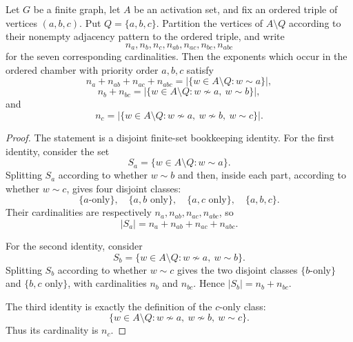 \begin{helper}
Let $G$ be a finite graph, let $A$ be an activation set, and fix an ordered
triple of vertices $(a,b,c)$.  Put $Q=\{a,b,c\}$.  Partition the vertices of
$A\setminus Q$ according to their nonempty adjacency pattern to the ordered
triple, and write
\[
n_a,n_b,n_c,n_{ab},n_{ac},n_{bc},n_{abc}
\]
for the seven corresponding cardinalities.  Then the exponents which occur in
the ordered chamber with priority order $a,b,c$ satisfy
\[
n_a+n_{ab}+n_{ac}+n_{abc}
=|\{w\in A\setminus Q:w\sim a\}|,
\]
\[
n_b+n_{bc}
=|\{w\in A\setminus Q:w\not\sim a,\ w\sim b\}|,
\]
and
\[
n_c
=|\{w\in A\setminus Q:w\not\sim a,\ w\not\sim b,\ w\sim c\}|.
\]
\end{helper}
\begin{proof}
The statement is a disjoint finite-set bookkeeping identity.  For the first
identity, consider the set
\[
S_a=\{w\in A\setminus Q:w\sim a\}.
\]
Splitting $S_a$ according to whether $w\sim b$ and then, inside each part,
according to whether $w\sim c$, gives four disjoint classes:
\[
\{a\text{-only}\},\quad \{a,b\text{ only}\},\quad
\{a,c\text{ only}\},\quad \{a,b,c\}.
\]
Their cardinalities are respectively
$n_a,n_{ab},n_{ac},n_{abc}$, so
\[
|S_a|=n_a+n_{ab}+n_{ac}+n_{abc}.
\]

For the second identity, consider
\[
S_b=\{w\in A\setminus Q:w\not\sim a,\ w\sim b\}.
\]
Splitting $S_b$ according to whether $w\sim c$ gives the two disjoint classes
$\{b\text{-only}\}$ and $\{b,c\text{ only}\}$, with cardinalities
$n_b$ and $n_{bc}$.  Hence $|S_b|=n_b+n_{bc}$.

The third identity is exactly the definition of the $c$-only class:
\[
\{w\in A\setminus Q:w\not\sim a,\ w\not\sim b,\ w\sim c\}.
\]
Thus its cardinality is $n_c$.
\end{proof}

